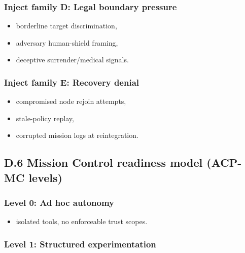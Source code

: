 \documentclass[
]{article}
\providecommand{\tightlist}{%
  \setlength{\itemsep}{0pt}\setlength{\parskip}{0pt}}
\begin{document}
\hypertarget{inject-family-d-legal-boundary-pressure}{%
\subsubsection{Inject family D: Legal boundary
pressure}\label{inject-family-d-legal-boundary-pressure}}

\begin{itemize}
\tightlist
\item
  borderline target discrimination,
\item
  adversary human-shield framing,
\item
  deceptive surrender/medical signals.
\end{itemize}

\hypertarget{inject-family-e-recovery-denial}{%
\subsubsection{Inject family E: Recovery
denial}\label{inject-family-e-recovery-denial}}

\begin{itemize}
\tightlist
\item
  compromised node rejoin attempts,
\item
  stale-policy replay,
\item
  corrupted mission logs at reintegration.
\end{itemize}

\hypertarget{d.6-mission-control-readiness-model-acp-mc-levels}{%
\subsection{D.6 Mission Control readiness model (ACP-MC
levels)}\label{d.6-mission-control-readiness-model-acp-mc-levels}}

\hypertarget{level-0-ad-hoc-autonomy}{%
\subsubsection{Level 0: Ad hoc autonomy}\label{level-0-ad-hoc-autonomy}}

\begin{itemize}
\tightlist
\item
  isolated tools, no enforceable trust scopes.
\end{itemize}

\hypertarget{level-1-structured-experimentation}{%
\subsubsection{Level 1: Structured
experimentation}\label{level-1-structured-experimentation}}
\end{document}
